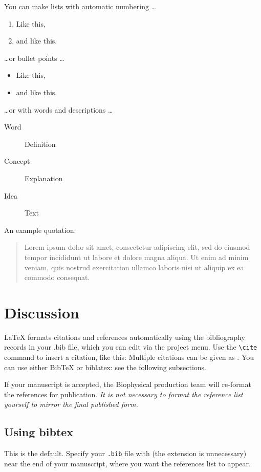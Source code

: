 \documentclass{biophys-new}
\begin{document}
You can make lists with automatic numbering \dots

\begin{enumerate}
\item Like this,
\item and like this.
\end{enumerate}

\dots or bullet points \dots

\begin{itemize} 
\item Like this,
\item and like this.
\end{itemize}

\dots or with words and descriptions \dots

\begin{description}
\item[Word] Definition
\item[Concept] Explanation
\item[Idea] Text
\end{description}

An example quotation:

\begin{quote}
Lorem ipsum dolor sit amet, consectetur adipiscing elit, sed do eiusmod tempor incididunt ut labore et dolore magna aliqua. Ut enim ad minim veniam, quis nostrud exercitation ullamco laboris nisi ut aliquip ex ea commodo consequat.
\end{quote}


\section*{Discussion}

\LaTeX{} formats citations and references automatically using the bibliography records in your .bib file, which you can edit via the project menu. Use the \verb|\cite| command to insert a citation, like this: \cite{Chen_Nicholson00} Multiple citations can be given as \cite{Stiles_Bartol01,el-Kareh_etal93,Callaghan91}. You can use either BibTeX or biblatex: see the following subsections.

If your manuscript is accepted, the Biophysical production team will re-format the references for publication. \emph{It is not necessary to format the reference list yourself to mirror the final published form.}

\subsection*{Using bibtex} 
This is the default. Specify your \texttt{.bib} file with \verb|| (the extension is unnecessary) near the end of your manuscript, where you want the references list to appear.
\end{document}
